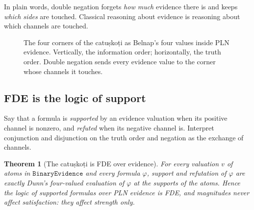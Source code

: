 \documentclass[11pt]{article}
\newcommand{\code}[1]{\texttt{#1}}
\newcommand{\BE}{\code{BinaryEvidence}}
\theoremstyle{plain}
\newtheorem{theorem}{Theorem}[section]
\theoremstyle{definition}
\begin{document}
\noindent In plain words, double negation forgets \emph{how much} evidence there is and keeps
\emph{which sides} are touched. Classical reasoning about evidence is reasoning about which
channels are touched.

\begin{figure}[ht]
\centering
{}
\caption{The four corners of the catuṣkoṭi as Belnap's four values \cite{Belnap1977} inside
PLN evidence.
Vertically, the information order; horizontally, the truth order. Double negation sends
every evidence value to the corner whose channels it touches.}
\label{fig:corners}
\end{figure}

\subsection{FDE is the logic of support}

Say that a formula is \emph{supported} by an evidence valuation when its positive channel is
nonzero, and \emph{refuted} when its negative channel is. Interpret conjunction and
disjunction on the truth order and negation as the exchange of channels.

\begin{theorem}[The catuṣkoṭi is FDE over evidence]
For every valuation $v$ of atoms in $\BE$ and every formula $\varphi$, support and
refutation of $\varphi$ are exactly Dunn's four-valued evaluation \cite{Dunn1976} of
$\varphi$ at the supports of the atoms. Hence the logic of supported formulas over PLN evidence is FDE, and
magnitudes never affect satisfaction: they affect strength only.
\end{theorem}
\end{document}
